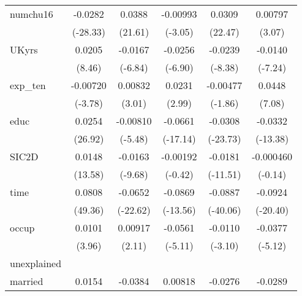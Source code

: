 \begin{table}[htbp]
\begin{tabular}{l*{5}{c}}
numchu16    &     -0.0282\sym{***}&      0.0388\sym{***}&    -0.00993\sym{**} &      0.0309\sym{***}&     0.00797\sym{**} \\
            &    (-28.33)         &     (21.61)         &     (-3.05)         &     (22.47)         &      (3.07)         \\
UKyrs       &      0.0205\sym{***}&     -0.0167\sym{***}&     -0.0256\sym{***}&     -0.0239\sym{***}&     -0.0140\sym{***}\\
            &      (8.46)         &     (-6.84)         &     (-6.90)         &     (-8.38)         &     (-7.24)         \\
exp\_ten     &    -0.00720\sym{***}&     0.00832\sym{**} &      0.0231\sym{**} &    -0.00477         &      0.0448\sym{***}\\
            &     (-3.78)         &      (3.01)         &      (2.99)         &     (-1.86)         &      (7.08)         \\
educ        &      0.0254\sym{***}&    -0.00810\sym{***}&     -0.0661\sym{***}&     -0.0308\sym{***}&     -0.0332\sym{***}\\
            &     (26.92)         &     (-5.48)         &    (-17.14)         &    (-23.73)         &    (-13.38)         \\
SIC2D       &      0.0148\sym{***}&     -0.0163\sym{***}&    -0.00192         &     -0.0181\sym{***}&   -0.000460         \\
            &     (13.58)         &     (-9.68)         &     (-0.42)         &    (-11.51)         &     (-0.14)         \\
time        &      0.0808\sym{***}&     -0.0652\sym{***}&     -0.0869\sym{***}&     -0.0887\sym{***}&     -0.0924\sym{***}\\
            &     (49.36)         &    (-22.62)         &    (-13.56)         &    (-40.06)         &    (-20.40)         \\
occup       &      0.0101\sym{***}&     0.00917\sym{*}  &     -0.0561\sym{***}&     -0.0110\sym{**} &     -0.0377\sym{***}\\
            &      (3.96)         &      (2.11)         &     (-5.11)         &     (-3.10)         &     (-5.12)         \\
\hline
unexplained &                     &                     &                     &                     &                     \\
married     &      0.0154\sym{**} &     -0.0384\sym{***}&     0.00818         &     -0.0276\sym{**} &     -0.0289\sym{*}  \\

\end{tabular}
\end{table}
